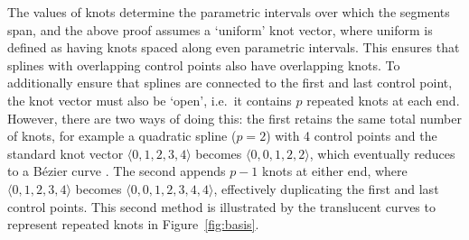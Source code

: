 The values of knots determine the parametric intervals over which the segments span, and the above proof assumes a `uniform' knot vector, where uniform is defined as having knots spaced along even parametric intervals. This ensures that splines with overlapping control points also have overlapping knots.
To additionally ensure that splines are connected to the first and last control point, the knot vector must also be `open', i.e.\ it contains $p$ repeated knots at each end.
However, there are two ways of doing this: the first retains the same total number of knots, for example a quadratic spline ($p=2$) with 4 control points and the standard knot vector $\langle0,1,2,3,4\rangle$ becomes $\langle0,0,1,2,2\rangle$, which eventually reduces to a B\'ezier curve \cite{Sederberg2005}. The second appends $p-1$ knots at either end, where $\langle0,1,2,3,4\rangle$ becomes $\langle0,0,1,2,3,4,4\rangle$, effectively duplicating the first and last control points.
This second method is illustrated by the translucent curves to represent repeated knots in Figure~\ref{fig:basis}.

